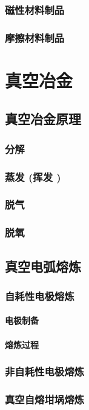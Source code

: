 \documentclass[UTF8]{../../ApplicationUniverse}
\begin{document}
        \subsubsection{磁性材料制品}
        \subsubsection{摩擦材料制品}
\section{真空冶金}
    \subsection{真空冶金原理}
        \subsubsection{分解}
        \subsubsection{蒸发 (挥发 )}
        \subsubsection{脱气}
        \subsubsection{脱氧}
    \subsection{真空电弧熔炼}
        \subsubsection{自耗性电极熔炼}
            \paragraph{电极制备}
            \paragraph{熔炼过程}
        \subsubsection{非自耗性电极熔炼}
        \subsubsection{真空自熔坩埚熔炼}
\end{document}
